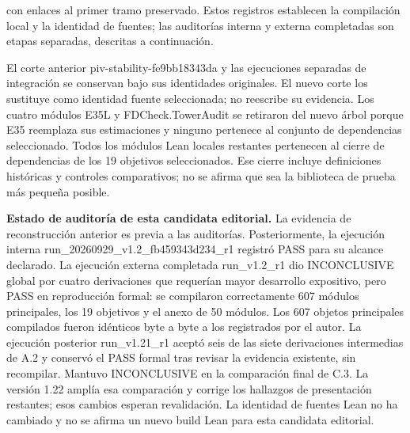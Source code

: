 \documentclass[spanish,11pt,a4paper]{article}
\begin{document}
con enlaces al primer tramo preservado. Estos registros establecen la compilación local y la identidad de fuentes; las auditorías interna y externa completadas son etapas separadas, descritas a continuación.

El corte anterior {\ttfamily\small piv-\discretionary{\hbox{\ensuremath{\hookrightarrow}}}{}{}stability-\discretionary{\hbox{\ensuremath{\hookrightarrow}}}{}{}fe9bb18343da} y las ejecuciones separadas de integración se conservan bajo sus identidades originales. El nuevo corte los sustituye como identidad fuente seleccionada; no reescribe su evidencia. Los cuatro módulos E35L y {\ttfamily\small FDCheck.\discretionary{\hbox{\ensuremath{\hookrightarrow}}}{}{}TowerAudit} se retiraron del nuevo árbol porque E35 reemplaza sus estimaciones y ninguno pertenece al conjunto de dependencias seleccionado. Todos los módulos Lean locales restantes pertenecen al cierre de dependencias de los 19 objetivos seleccionados. Ese cierre incluye definiciones históricas y controles comparativos; no se afirma que sea la biblioteca de prueba más pequeña posible.

\textbf{Estado de auditoría de esta candidata editorial.} La evidencia de reconstrucción anterior es previa a las auditorías. Posteriormente, la ejecución interna {\ttfamily\small run\_\discretionary{\hbox{\ensuremath{\hookrightarrow}}}{}{}20260929\_\discretionary{\hbox{\ensuremath{\hookrightarrow}}}{}{}v1.\discretionary{\hbox{\ensuremath{\hookrightarrow}}}{}{}2\_\discretionary{\hbox{\ensuremath{\hookrightarrow}}}{}{}fb459343d234\discretionary{\hbox{\ensuremath{\hookrightarrow}}}{}{}\_\discretionary{\hbox{\ensuremath{\hookrightarrow}}}{}{}r1} registró PASS para su alcance declarado. La ejecución externa completada {\ttfamily\small run\_\discretionary{\hbox{\ensuremath{\hookrightarrow}}}{}{}v1.\discretionary{\hbox{\ensuremath{\hookrightarrow}}}{}{}2\_\discretionary{\hbox{\ensuremath{\hookrightarrow}}}{}{}r1} dio INCONCLUSIVE global por cuatro derivaciones que requerían mayor desarrollo expositivo, pero PASS en reproducción formal: se compilaron correctamente 607 módulos principales, los 19 objetivos y el anexo de 50 módulos. Los 607 objetos principales compilados fueron idénticos byte a byte a los registrados por el autor. La ejecución posterior {\ttfamily\small run\_\discretionary{\hbox{\ensuremath{\hookrightarrow}}}{}{}v1.\discretionary{\hbox{\ensuremath{\hookrightarrow}}}{}{}21\_\discretionary{\hbox{\ensuremath{\hookrightarrow}}}{}{}r1} aceptó seis de las siete derivaciones intermedias de A.2 y conservó el PASS formal tras revisar la evidencia existente, sin recompilar. Mantuvo INCONCLUSIVE en la comparación final de C.3. La versión 1.22 amplía esa comparación y corrige los hallazgos de presentación restantes; esos cambios esperan revalidación. La identidad de fuentes Lean no ha cambiado y no se afirma un nuevo build Lean para esta candidata editorial.
\end{document}
